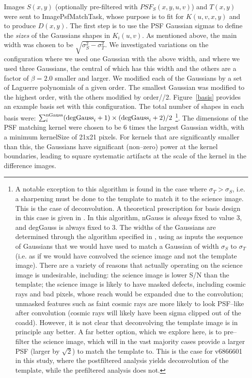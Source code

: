 \documentclass[prd, nofootinbib, floatfix, 11pt,tightenlines,times]{article}
\begin{document}
Images $S(x,y)$ (optionally pre-filtered with $PSF_S(x,y,u,v)$) and
$T(x,y)$ were sent to ImagePsfMatchTask, whose purpose is to fit for
$K(u,v,x,y)$ and to produce $D(x,y)$.  The first step is to use the
PSF Gaussian sigmas to define the {\it sizes} of the Gaussians shapes
in $K_i(u,v)$.  As mentioned above, the main width was chosen to be
$\sqrt{\sigma_S^2 - \sigma_T^2}$.  We investigated variations on the
configuration where we used one Gaussian with the above width, and
where we used three Gaussians, the central of which has this width and
the others are a factor of $\beta = 2.0$ smaller and larger.  We
modified each of the Gaussians by a set of Laguerre polynomials of a
given order.  The smallest Gaussian was modified to the highest order,
with the others modified by order//2.  Figure~\ref{basis} provides an
example basis set with this configuration.  The total number of shapes
in each basis were: $\sum_i^{\rm nGauss} ({\rm degGauss}_i+1)\times({\rm
  degGauss}_i+2)/2$ \footnote{ A notable exception to this algorithm
  is found in the case where $\sigma_T > \sigma_S$, i.e. a sharpening
  must be done to the template to match it to the science image.  This
  is the case of deconvolution.  A theoretical prescription for basis
  design in this case is given in \cite{0266-5611-26-8-085002}.  In
  this algorithm, nGauss is {\it always} fixed to value 3, and
  degGauss is always fixed to 3.  The widths of the Gaussians are
  determined through the algorithm specified in
  \cite{0266-5611-26-8-085002}, using as inputs the sequence of
  Gaussians that we would have used to match a Gaussian of width
  $\sigma_S$ to $\sigma_T$ (i.e. as if we would have convolved the
  science image and not the template image).  There are a variety of
  reasons that actually operating on the science image is undesirable,
  including: the science image is lower S/N than the template; the
  science image is likely to have masked defects, including cosmic
  rays and bad pixels, whose reach would be expanded due to the
  convolution; unmasked features such as faint cosmic rays are more
  likely to look PSF--like after convolution (cosmic rays will likely
  have been sigma clipped out of the coadd).  However, it is not clear
  that deconvolving the template image is in principle any better.  A
  far better option, which we explore here, is to pre--filter the
  science image, which will in the vast majority cases provide a
  larger PSF (larger by $\sqrt{2}$) to match the template to.  This is
  the case for v6866601 in this study, where the postfiltered analysis
  yields deconvolution of the template, while the prefiltered analysis
  does not.  }.
%
The dimensions of the PSF matching kernel were
chosen to be 6 times the largest Gaussian width, with a minimum
kernelSize of 21x21 pixels.  For kernels that are significantly
smaller than this, the Gaussians have significant (non--zero) power at
the kernel boundaries, leading to square systematic artifacts at the
scale of the kernel in the difference images.
\end{document}
